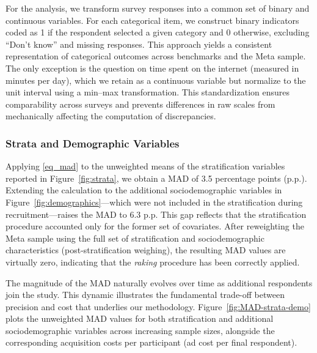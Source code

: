 \documentclass[letterpaper,12pt]{article}
\theoremstyle{proposition}
\begin{document}
For the analysis, we transform survey responses into a common set of binary and continuous variables. For each categorical item, we construct binary indicators coded as 1 if the respondent selected a given category and 0 otherwise, excluding ``Don’t know'' and missing responses. This approach yields a consistent representation of categorical outcomes across benchmarks and the Meta sample. The only exception is the question on time spent on the internet (measured in minutes per day), which we retain as a continuous variable but normalize to the unit interval using a min–max transformation. This standardization ensures comparability across surveys and prevents differences in raw scales from mechanically affecting the computation of discrepancies.







\subsubsection*{Strata and Demographic Variables}
Applying \eqref{eq_mad} to the unweighted means of the stratification variables reported in Figure~\ref{fig:strata}, we obtain a MAD of 3.5 percentage points (p.p.). Extending the calculation to the additional sociodemographic variables in Figure~\ref{fig:demographics}—which were not included in the stratification during recruitment—raises the MAD to 6.3 p.p. This gap reflects that the stratification procedure accounted only for the former set of covariates.
After reweighting the Meta sample using the full set of stratification and sociodemographic characteristics (post-stratification weighing), the resulting MAD values are virtually zero, indicating that the \textit{raking} procedure has been correctly applied. 

The magnitude of the MAD naturally evolves over time as additional respondents join the study. This dynamic illustrates the fundamental trade-off between precision and cost that underlies our methodology. Figure~\ref{fig:MAD-strata-demo} plots the unweighted MAD values for both stratification and additional sociodemographic variables across increasing sample sizes, alongside the corresponding acquisition costs per participant (ad cost per final respondent).
\end{document}
